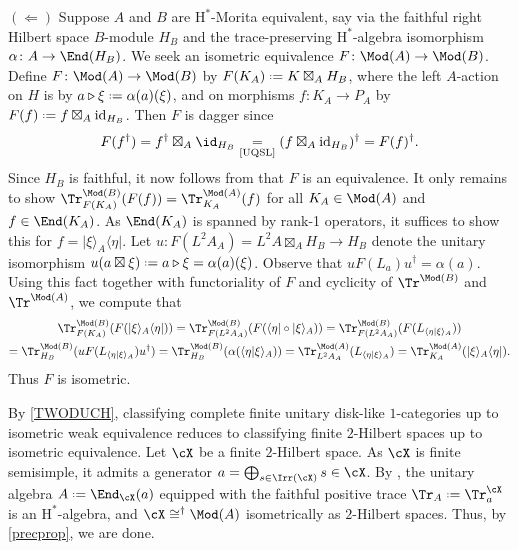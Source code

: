 \documentclass[12pt,reqno]{amsart}
\newcounter{alpha}\renewcommand\thealpha{\upshape\Alph{alpha}}
\newcommand{\bra}[1]{\langle#1\rvert}
\newcommand{\ket}[1]{\lvert#1\rangle}
\newcommand{\bkt}[2]{\langle #1|#2 \rangle}
\newcommand{\Hstar}{\ensuremath{\mathrm{H}^{*}}}
\newcommand{\itemstep}[1]{\smallskip\noindent\underline{#1}}
\DeclareRobustCommand{\coloneq}{\mathrel{\vcenter{\baselineskip0.5ex\lineskiplimit0pt\hbox{\scriptsize{\upshape.}}\hbox{\scriptsize{\upshape.}}}}=}
\begin{document}
\begin{pf}
\itemstep{$(\Leftarrow)$} Suppose $A$ and $B$ are $\Hstar$-Morita equivalent, say via the faithful right Hilbert space $B$-module $H_B$ and the trace-preserving $\Hstar$-algebra isomorphism $\alpha\colon A \to \End(H_B)$. We seek an isometric equivalence $F\colon \Mod(A) \to \Mod(B)$. Define $F \colon \Mod(A) \to \Mod(B)$ by $F(K_A)\coloneq K \boxtimes_A H_B$, where the left $A$-action on $H$ is by $a \triangleright \xi \coloneq \alpha(a)(\xi)$, and on morphisms $f\colon K_A \to P_A$ by $F(f) \coloneq f \boxtimes_A \mathrm{id}_{H_B}$. Then $F$ is dagger since
\[
F(f^\dag) = f^\dag \boxtimes_A \id_{H_B}
\underset{\text{\cite[Exr. I.3.2.34]{UQSL}}}{=}
(f \boxtimes_A \mathrm{id}_{H_B})^\dag
= F(f)^\dag.
\]
Since $H_B$ is faithful, it now follows from \cite[Cor. I.3.3.12]{UQSL} that $F$ is an equivalence. It only remains to show $\Tr^{\Mod(B)}_{F(K_A)}(F(f)) = \Tr^{\Mod(A)}_{K_A}(f)$ for all $K_A \in \Mod(A)$ and $f \in \End(K_A)$.
As $\End(K_A)$ is spanned by rank-1 operators, it suffices to show this for $f = \ket{\xi}_A\bra{\eta}$. Let $u \colon F(L^2A_A) = L^2A \boxtimes_A H_B \to H_B$ denote the unitary isomorphism
$u(a \boxtimes \xi) \coloneq a \triangleright \xi = \alpha(a)(\xi)$. Observe that $u F(L_a) u^\dag = \alpha(a)$. Using this fact together with functoriality of $F$ and cyclicity of $\Tr^{\Mod(B)}$ and $\Tr^{\Mod(A)}$, we compute that
\begin{multline*}
\Tr_{F(K_A)}^{\Mod(B)} (F(\ket{\xi}_A \bra{\eta}))
= \Tr_{F(L^2A_A)}^{\Mod(B)} (F(\bra{\eta} \circ \ket{\xi}_A))
= \Tr_{F(L^2A_A)}^{\Mod(B)} (F(L_{\bkt{\eta}{\xi}_A})) \\
= \Tr_{H_B}^{\Mod(B)} (u F(L_{\bkt{\eta}{\xi}_A}) u^\dag)
= \Tr_{H_B}^{\Mod(B)} (\alpha(\bkt{\eta}{\xi}_A))
= \Tr_{L^2A_A}^{\Mod(A)} (L_{\bkt{\eta}{\xi}_A})
= \Tr_{K_A}^{\Mod(A)} ( \ket{\xi}_A\bra\eta).
\end{multline*}
Thus $F$ is isometric.
\end{pf}


\TWODCLASS*


\begin{pf}
  By \cref{TWODUCH}, classifying complete finite unitary disk-like $1$-categories up to isometric weak equivalence reduces to classifying finite $2$-Hilbert spaces up to isometric equivalence. Let $\cX$ be a finite $2$-Hilbert space. As $\cX$ is finite semisimple, it admits a generator $a=\bigoplus_{s\in\Irr(\cX)}s \in \cX$. By \cite[Exm. 2.14]{3Hilb}, the unitary algebra $A \coloneq \End_{\cX}(a)$ equipped with the faithful positive trace $\Tr_A \coloneq \Tr^{\cX}_a$ is an $\Hstar$-algebra, and $\cX \cong^\dag \Mod(A)$ isometrically as $2$-Hilbert spaces. Thus, by \cref{precprop}, we are done.
\end{pf}
\end{document}
